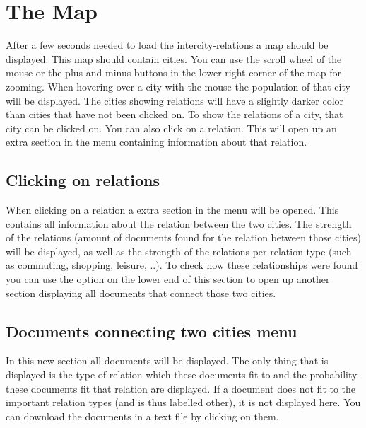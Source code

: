 \section{The Map}
After a few seconds needed to load the intercity-relations a map should be displayed. This map should contain cities. You can use the scroll wheel of the mouse or the plus and minus buttons in the lower right corner of the map for zooming. When hovering over a city with the mouse the population of that city will be displayed. The cities showing relations will have a slightly darker color than cities that have not been clicked on. To show the relations of a city, that city can be clicked on. You can also click on a relation. This will open up an extra section in the menu containing information about that relation.

\subsection{Clicking on relations}
When clicking on a relation a extra section in the menu will be opened. This contains all information about the relation between the two cities. The strength of the relations (amount of documents found for the relation between those cities) will be displayed, as well as the strength of the relations per relation type (such as commuting, shopping, leisure, ..). To check how these relationships were found you can use the option on the lower end of this section to open up another section displaying all documents that connect those two cities.

\subsection{Documents connecting two cities menu}
In this new section all documents will be displayed. The only thing that is displayed is the type of relation which these documents fit to and the probability these documents fit that relation are displayed. If a document does not fit to the important relation types (and is thus labelled other), it is not displayed here. You can download the documents in a text file by clicking on them.


